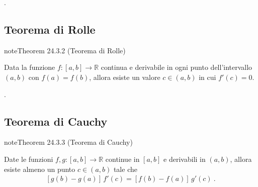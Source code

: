 \documentclass[letterpaper,10pt,italian]{jupyterBook}
\begin{document}
\sphinxAtStartPar
{\hyperref[\detokenize{ch/infinitesimal_calculus/derivatives-notes:infinitesimal-calculus-derivatives-thm-fermat-notes}]{}}.




\subsection{Teorema di Rolle}
\label{\detokenize{ch/infinitesimal_calculus/derivatives:teorema-di-rolle}}\label{\detokenize{ch/infinitesimal_calculus/derivatives:infinitesimal-calculus-derivatives-thm-rolle}}\label{ch/infinitesimal_calculus/derivatives:thm:infinitesimal-calculus:derivatives:thm:rolle}
\begin{sphinxadmonition}{note}{Theorem 24.3.2 (Teorema di Rolle)}



\sphinxAtStartPar
Data la funzione \(f: [a,b] \rightarrow \mathbb{R}\) continua e derivabile in ogni punto dell’intervallo \((a,b)\) con \(f(a) = f(b)\), allora esiste un valore \(c \in (a,b)\) in cui \(f'(c) = 0\).
\end{sphinxadmonition}

\sphinxAtStartPar
{\hyperref[\detokenize{ch/infinitesimal_calculus/derivatives-notes:infinitesimal-calculus-derivatives-thm-rolle-notes}]{}}.


\subsection{Teorema di Cauchy}
\label{\detokenize{ch/infinitesimal_calculus/derivatives:teorema-di-cauchy}}\label{\detokenize{ch/infinitesimal_calculus/derivatives:infinitesimal-calculus-derivatives-thm-cauchy}}\label{ch/infinitesimal_calculus/derivatives:thm:infinitesimal-calculus:derivatives:thm:cauchy}
\begin{sphinxadmonition}{note}{Theorem 24.3.3 (Teorema di Cauchy)}



\sphinxAtStartPar
Date le funzioni \(f, g: [a,b] \rightarrow \mathbb{R}\) continue in \([a,b]\) e derivabili in \((a,b)\), allora esiste almeno un punto \(c \in (a,b)\) tale che
\begin{equation*}
\begin{split}\left[ g(b) - g(a) \right] \, f'(c) = \left[ f(b) - f(a) \right] \, g'(c) \ .\end{split}
\end{equation*}\end{sphinxadmonition}
\end{document}
